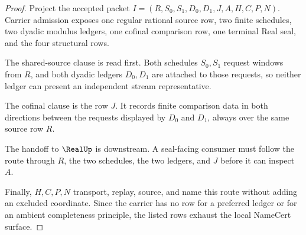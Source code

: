 \begin{proof}
Project the accepted packet $I=(R,S_0,S_1,D_0,D_1,J,A,H,C,P,N)$. Carrier admission exposes one regular rational source row, two finite schedules, two dyadic modulus ledgers, one cofinal comparison row, one terminal Real seal, and the four structural rows.

The shared-source clause is read first. Both schedules $S_0,S_1$ request windows from $R$, and both dyadic ledgers $D_0,D_1$ are attached to those requests, so neither ledger can present an independent stream representative.

The cofinal clause is the row $J$. It records finite comparison data in both directions between the requests displayed by $D_0$ and $D_1$, always over the same source row $R$.

The handoff to $\RealUp$ is downstream. A seal-facing consumer must follow the route through $R$, the two schedules, the two ledgers, and $J$ before it can inspect $A$.

Finally, $H,C,P,N$ transport, replay, source, and name this route without adding an excluded coordinate. Since the carrier has no row for a preferred ledger or for an ambient completeness principle, the listed rows exhaust the local NameCert surface.
\end{proof}

